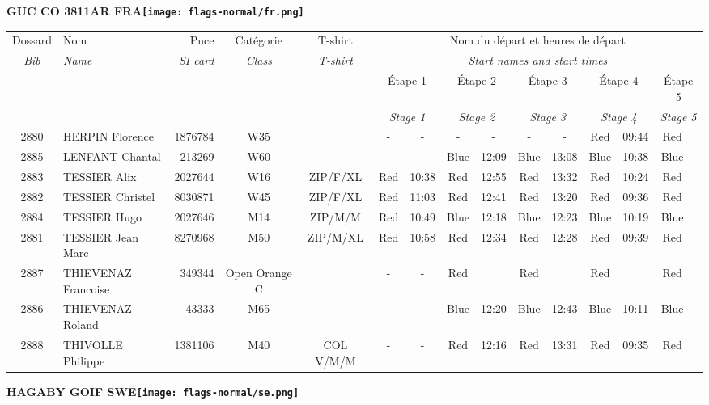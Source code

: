 \documentclass{report}
\begin{document}
\newpage
  \Huge \centering \bfseries GUC CO 3811AR FRA\normalfont \footnotesize \sffamily \hfill \texttt{[image: flags-normal/fr.png]} \newline 
  \begin{longtable}{|c|l|r|c|c|*{5}{cc|}}
    Dossard & Nom  & Puce    & Catégorie & T-shirt & \multicolumn{10}{c|}{Nom du départ et heures de départ} \\
    \itshape Bib     & \itshape Name & \itshape SI card & \itshape Class  & \itshape  T-shirt  & \multicolumn{10}{c|}{\itshape Start names and start times} \\
    \hline
    & & & & & \multicolumn{2}{c|}{Étape 1} & \multicolumn{2}{c|}{Étape 2} & \multicolumn{2}{c|}{Étape 3} & \multicolumn{2}{c|}{Étape 4} & \multicolumn{2}{c|}{Étape 5} \\
    & & & & & \multicolumn{2}{c|}{\itshape Stage 1} & \multicolumn{2}{c|}{\itshape Stage 2} & \multicolumn{2}{c|}{\itshape Stage 3} & \multicolumn{2}{c|}{\itshape Stage 4} & \multicolumn{2}{c|}{\itshape Stage 5} \\
    \hline
    2880 & HERPIN Florence & 1876784 & W35 &   & - &  - & - &  - & - &  - & Red & 09:44 & Red &  \\
    2885 & LENFANT Chantal & 213269 & W60 &   & - &  - & Blue & 12:09 & Blue & 13:08 & Blue & 10:38 & Blue &  \\
    2883 & TESSIER Alix & 2027644 & W16 & ZIP/F/XL & Red & 10:38 & Red & 12:55 & Red & 13:32 & Red & 10:24 & Red &  \\
    2882 & TESSIER Christel & 8030871 & W45 & ZIP/F/XL & Red & 11:03 & Red & 12:41 & Red & 13:20 & Red & 09:36 & Red &  \\
    2884 & TESSIER Hugo & 2027646 & M14 & ZIP/M/M & Red & 10:49 & Blue & 12:18 & Blue & 12:23 & Blue & 10:19 & Blue &  \\
    2881 & TESSIER Jean Marc & 8270968 & M50 & ZIP/M/XL & Red & 10:58 & Red & 12:34 & Red & 12:28 & Red & 09:39 & Red &  \\
    2887 & THIEVENAZ Francoise & 349344 & Open Orange C &   & - &  - & Red &   & Red &   & Red &   & Red &  \\
    2886 & THIEVENAZ Roland & 43333 & M65 &   & - &  - & Blue & 12:20 & Blue & 12:43 & Blue & 10:11 & Blue &  \\
    2888 & THIVOLLE Philippe & 1381106 & M40 & COL V/M/M & - &  - & Red & 12:16 & Red & 13:31 & Red & 09:35 & Red &  \\
  \end{longtable}
\newpage
  \Huge \centering \bfseries HAGABY GOIF  SWE\normalfont \footnotesize \sffamily \hfill \texttt{[image: flags-normal/se.png]} \newline 
\end{document}
